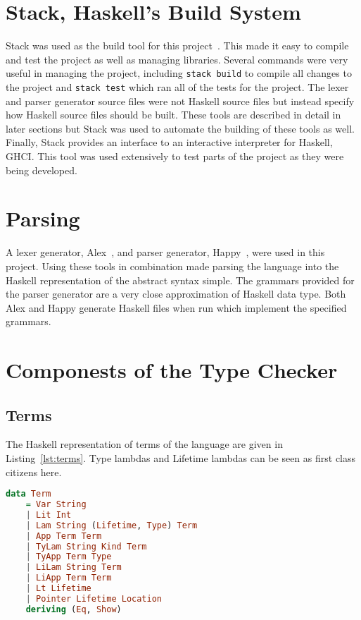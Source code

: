 \section{Stack, Haskell's Build System}
Stack was used as the build tool for this project~\cite{stack}. This made it
easy to compile and test the project as well as managing libraries. Several
commands were very useful in managing the project, including \lstinline{stack build}
to compile all changes to the project and \lstinline{stack test} which
ran all of the tests for the project. The lexer and parser generator source
files were not Haskell source files but instead specify how Haskell source
files should be built. These tools are described in detail in later sections
but Stack was used to automate the building of these tools as well. Finally,
Stack provides an interface to an interactive interpreter for Haskell, GHCI.
This tool was used extensively to test parts of the project as they were being
developed.

\section{Parsing}
A lexer generator, Alex~\cite{alex}, and parser generator, Happy~\cite{happy},
were used in this project. Using these tools in combination made parsing the
language into the Haskell representation of the abstract syntax simple.  The
grammars provided for the parser generator are a very close approximation of
Haskell data type. Both Alex and Happy generate Haskell files when run which
implement the specified grammars.


\section{Componests of the Type Checker}
\subsection{Terms}
The Haskell representation of terms of the language are given in
Listing~\ref{lst:terms}.  Type lambdas and Lifetime lambdas can be seen as
first class citizens here.

\begin{lstlisting}[caption=Haskell representation of Terms., language=Haskell, label={lst:terms}]
data Term
    = Var String
    | Lit Int
    | Lam String (Lifetime, Type) Term
    | App Term Term
    | TyLam String Kind Term 
    | TyApp Term Type
    | LiLam String Term
    | LiApp Term Term
    | Lt Lifetime
    | Pointer Lifetime Location
    deriving (Eq, Show)
\end{lstlisting}

